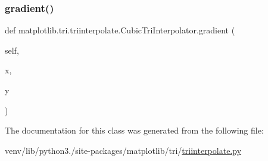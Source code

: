\subsubsection{\texorpdfstring{gradient()}{gradient()}}
{\footnotesize\ttfamily def matplotlib.\+tri.\+triinterpolate.\+Cubic\+Tri\+Interpolator.\+gradient (\begin{DoxyParamCaption}\item[{}]{self,  }\item[{}]{x,  }\item[{}]{y }\end{DoxyParamCaption})}



The documentation for this class was generated from the following file\+:\begin{DoxyCompactItemize}
\item 
venv/lib/python3./site-\/packages/matplotlib/tri/\hyperlink{triinterpolate_8py}{triinterpolate.\+py}\end{DoxyCompactItemize}
